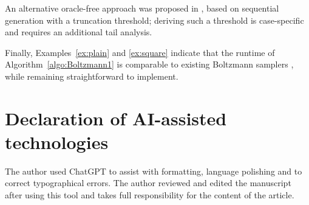 \documentclass[a4paper,10pt]{article}
\theoremstyle{definition}
\begin{document}
An alternative oracle-free approach was proposed in \cite{pey2}, based on sequential generation with a truncation threshold; deriving such a threshold is case-specific and requires an additional tail analysis.

Finally, Examples~\ref{ex:plain} and \ref{ex:square} indicate that the runtime of Algorithm~\ref{algo:Boltzmann1} is comparable to existing Boltzmann samplers \cite{Flajolet, pey2}, while remaining straightforward to implement.

\section*{Declaration of AI-assisted technologies}
The author used ChatGPT to assist with formatting, language polishing and to correct typographical errors. The author reviewed and edited the manuscript after using this tool and takes full responsibility for the content of the article.



\end{document}
